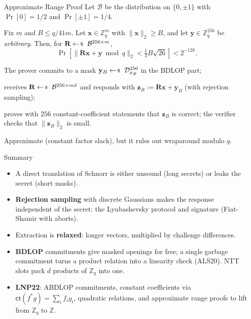 \documentclass{zkdl-presentation-template}
\begin{document}
    \begin{frame}{Approximate Range Proof}
        Let $\mathcal{B}$ be the distribution on $\{0, \pm 1\}$ with $\Pr[0] = 1/2$ and $\Pr[\pm 1] = 1/4$.
        \begin{lemma}
            Fix $m$ and $B \leq q/41m$. Let $\mathbf{x} \in \mathbb{Z}_q^m$ with $\|\mathbf{x}\|_2 \geq B$, and let $\mathbf{y} \in \mathbb{Z}_q^{256}$ be \emph{arbitrary}. Then, for $\mathbf{R} \leftarrowS \mathcal{B}^{256 \times m}$,
            \begin{equation*}
                \Pr\left[\|\mathbf{R}\mathbf{x} + \mathbf{y} \bmod q\|_2 < \tfrac{1}{2}B\sqrt{26}\right] < 2^{-128}.
            \end{equation*}
        \end{lemma}
        \pause

        \begin{algoen}
            \item The prover commits to a mask $\mathbf{y}_B \leftarrowS \dgaussian_{\sigma_B}^{256}$ in the BDLOP part;\pause
            \item receives $\mathbf{R} \leftarrowS \mathcal{B}^{256 \times md}$ and responds with $\mathbf{z}_B := \mathbf{R}\mathbf{x} + \mathbf{y}_B$ (with rejection sampling);\pause
            \item proves with $256$ constant-coefficient statements that $\mathbf{z}_B$ is correct; the verifier checks that $\|\mathbf{z}_B\|_2$ is small.
        \end{algoen}
        \pause

        {\small Approximate (constant factor slack), but it rules out wraparound modulo $q$.}
    \end{frame}

    \begin{frame}{Summary}
        \begin{itemize}
            \item A direct translation of Schnorr is either unsound (long secrets) or leaks the secret (short masks).\pause
            \item \textbf{Rejection sampling} with discrete Gaussians makes the response independent of the secret: the Lyubashevsky protocol and signature (Fiat-Shamir with aborts).\pause
            \item Extraction is \textbf{relaxed}: longer vectors, multiplied by challenge differences.\pause
            \item \textbf{BDLOP} commitments give masked openings for free; a single garbage commitment turns a product relation into a linearity check (ALS20). NTT slots pack $d$ products of $\mathbb{Z}_q$ into one.\pause
            \item \textbf{LNP22}: ABDLOP commitments, constant coefficients via $\mathsf{ct}(f^{\ast}g) = \sum_i f_ig_i$, quadratic relations, and approximate range proofs to lift from $\mathbb{Z}_q$ to $\mathbb{Z}$.
        \end{itemize}
    \end{frame}

    \makeclosingframe
\end{document}
